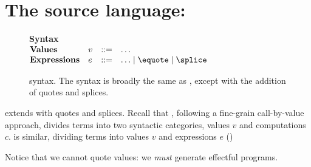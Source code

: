 \section{The source language: \texorpdfstring{\sourceLang{}}{Lambda-Op-Quote-Splice}}\label{section:source-lang}
\begin{figure}
\begin{source-desc}
  {\large \textbf{Syntax}} \\

  $\begin{array}{@{}llll}
    \textbf{Values} & v & ::= & \ldots \\
    \textbf{Expressions} & e & ::= & \ldots \mid \equote \mid \splice
  \end{array}$
\end{source-desc}
\caption{\sourceLang{} syntax. The syntax is broadly the same as \efflang{}, except with the addition of quotes and splices.}
\label{fig:source-syntax}
\end{figure}
\sourceLang{} extends \efflang{} with quotes and splices. Recall that \efflang{}, following a fine-grain call-by-value approach, divides terms into two syntactic categories, values $v$ and computations $c$. \sourceLang{} is similar, dividing terms into values $v$ and expressions $e$ ()

Notice that we cannot quote values: we \textit{must} generate effectful programs.
